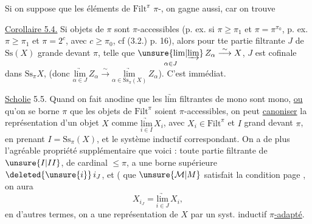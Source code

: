 Si on suppose  que les
éléments de $\mathrm{Filt}^{\pi}$  $\pi$-,
on gagne aussi, car on trouve

\uline{Corollaire 5.4.} Si  objets de $\pi$
sont $\pi$-accessibles (p. ex. si $\pi\geq\pi_1$ et $\pi=\pi^{\pi_0}$,
p. ex. $\pi\geq\pi_1$ et $\pi=2^c$, avec $c\geq\pi_0$, cf
(3.2.) p. 16), alors pour tte partie filtrante
$J$ de $\mathrm{Ss}(X)$ grande devant $\pi$, telle que
$\underset{\alpha\in J}{\unsure{\mathrm{lim}|\underrightarrow{\mathrm{lim}}}}\,Z_\alpha\overset{\sim}{\longrightarrow}X$,
$J$ est cofinale dans $\mathrm{Ss}_{\pi}X$,
(donc $\underset{\alpha\in J}{\underrightarrow{\mathrm{lim}}}\,Z_\alpha\overset{\sim}{\longrightarrow}
\underset{\alpha\in\mathrm{Ss}_{\pi}(X)}{\underrightarrow{\mathrm{lim}}}\,Z_\alpha$)\deleted{\unsure{)}}.
 C'est immédiat.



\uline{Scholie} 5.5. Quand on fait 
anodine que les $\underrightarrow{\mathrm{lim}}$ filtrantes de mono sont
mono, \uline{ou} qu'on se borne 
$\pi$  que les objets de $\mathrm{Filt}^{\pi}$ soient
$\pi$-accessibles, on peut \uline{canoniser} la
représentation d'un objet $X$ comme $\underset{i\in I}{\underrightarrow{\mathrm{lim}}}\,X_i$,
avec $X_i\in\mathrm{Filt}^{\pi}$ et  $I$ grand devant $\pi$,
en prenant $I=\mathrm{Ss}_{\pi}(X)$, et le système
inductif correspondant. 
On a de plus l'agréable propriété supplémentaire que
voici : toute partie filtrante  de $\unsure{I|II}$,
de cardinal $\leq\pi$, a une borne
supérieure $\deleted{\unsure{i}}\,i_J$, et (   que
$\unsure{\mathcal M|M}$ satisfait la condition  page ,  on
aura
\[
 X_{i_J}=\underset{i\in J}{\underrightarrow{\mathrm{lim}}}\,X_i,
\]
en d'autres termes, on a une représentation
 de $X$ par un syst. inductif 
\uline{$\pi$-adapté}.

